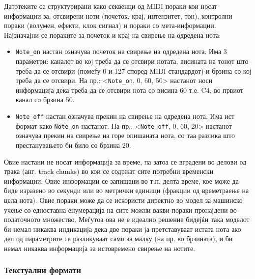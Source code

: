 Датотеките се структурирани како секвенци од MIDI пораки кои носат информации за: отсвирени ноти (почеток, крај, интензитет, тон), контролни пораки (волумен, ефекти, клок сигнал) и пораки со мета-информации. Најзначајни се пораките за почеток и крај на свирење на одредена нота:
\begin{itemize}
    \item \texttt{Note\_on} настан означува почеток на свирење на одредена нота. Има 3 параметри: каналот во кој треба да се отсвири нотата, висината на тонот што треба да се отсвири (помеѓу 0 и 127 според MIDI стандардот) и брзина со кој треба да се отсвири. На пр.: <\texttt{Note\_on}, 0, 60, 50> настанот носи информација дека треба да се отсвири нота со висина 60 т.е. C4, во првиот канал со брзина 50.
    \item \texttt{Note\_off} настан означува прекин на свирење на одредена нота. Има ист формат како \texttt{Note\_on} настанот. На пр.: <\texttt{Note\_off}, 0, 60, 20> настанот означува прекин на свирење на горе опишаната нота, со таа разлика што престанувањето би било со брзина 20.
\end{itemize}
Овие настани не носат информација за време, па затоа се вградени во делови од трака (анг. track chunks) во кои се содржат сите потребни временски информации. Овие информации се запишани во т.н. делта време, кое може да биде изразено во секунди или во метрички единици (фракции од времетраење на цела нота).
Овие пораки може да се искористи директно во модел за машинско учење со едноставна енумерација на сите можни вакви пораки пронајдени во податочното множество. Меѓутоа ова не е идеално решение бидејќи така моделот би немал никаква индикација дека две пораки ја претставуваат истата нота ако дел од параметрите се разликуваат само за малку (на пр. во брзината), и би немал никаква информација за истовремено свирење на нотите.

\subsubsection{Текстуални формати}

